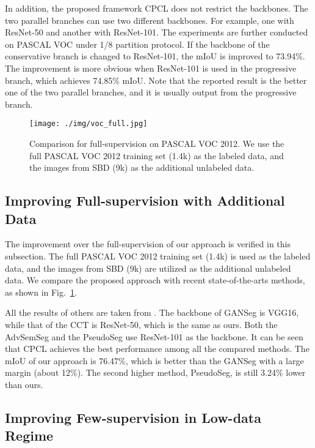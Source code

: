 \documentclass[journal]{IEEEtran}
\begin{document}
In addition, the proposed framework CPCL does not restrict the backbones. The two parallel branches can use two different backbones. For example, one with 
ResNet-50 and another with ResNet-101. The experiments are further conducted on PASCAL VOC under 1/8 partition protocol. If the backbone of the conservative 
branch is changed to ResNet-101, the mIoU is improved to 73.94\%. The improvement is more obvious when ResNet-101 is used in the progressive branch, which 
achieves 74.85\% mIoU. Note that the reported result is the better one of the two parallel branches, and it is usually output from the progressive branch.

\begin{figure}[h]
  \centering
  \texttt{[image: ./img/voc\_full.jpg]}
  \caption{Comparison for full-supervision on PASCAL VOC 2012. We use the full PASCAL VOC 2012 training set (1.4k) as the labeled data, and the images from SBD (9k) as the 
  additional unlabeled data.}
  \label{fig:voc_full}
\end{figure}

\subsection{Improving Full-supervision with Additional Data}

The improvement over the full-supervision of our approach is verified in this subsection. The full PASCAL VOC 2012 training set (1.4k) is used as the labeled data, and the 
images from SBD (9k) are utilized as the additional unlabeled data. We compare the proposed approach with recent state-of-the-arts methods, as shown in Fig.~\ref{fig:voc_full}. 

All the results of others are taken from \cite{pseudoseg}. The backbone of GANSeg \cite{souly2017semi} is VGG16, while that of the CCT \cite{CCT} is ResNet-50, which is the same 
as ours. Both the AdvSemSeg \cite{ALS4} and the PseudoSeg \cite{pseudoseg} use ResNet-101 as the backbone. It can be seen that CPCL achieves the best performance among all 
the compared methods. The mIoU of our approach is 76.47\%, which is better than the GANSeg with a large margin (about 12\%). The second higher method, PseudoSeg, is still 3.24\% lower than ours. 

\subsection{Improving Few-supervision in Low-data Regime}
\end{document}

